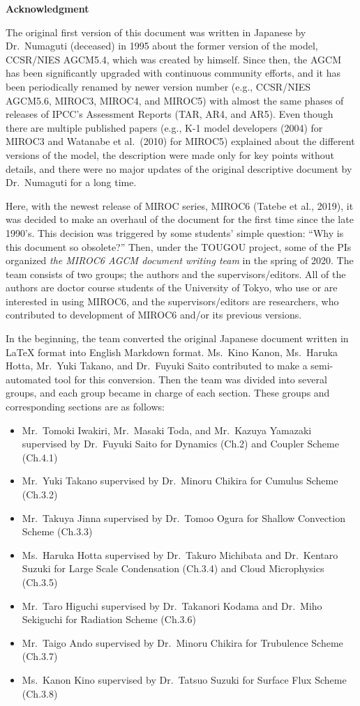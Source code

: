 \textbf{Acknowledgment}

The original first version of this document was written in Japanese by
Dr.~Numaguti (deceased) in 1995 about the former version of the model,
CCSR/NIES AGCM5.4, which was created by himself. Since then, the AGCM
has been significantly upgraded with continuous community efforts, and
it has been periodically renamed by newer version number (e.g.,
CCSR/NIES AGCM5.6, MIROC3, MIROC4, and MIROC5) with almost the same
phases of releases of IPCC's Assessment Reports (TAR, AR4, and AR5).
Even though there are multiple published papers (e.g., K-1 model
developers (2004) for MIROC3 and Watanabe et al.~(2010) for MIROC5)
explained about the different versions of the model, the description
were made only for key points without details, and there were no major
updates of the original descriptive document by Dr.~Numaguti for a long
time.

Here, with the newest release of MIROC series, MIROC6 (Tatebe et al.,
2019), it was decided to make an overhaul of the document for the first
time since the late 1990's. This decision was triggered by some
students' simple question: ``Why is this document so obsolete?'' Then,
under the TOUGOU project, some of the PIs organized \emph{the MIROC6
AGCM document writing team} in the spring of 2020. The team consists of
two groups; the authors and the supervisors/editors. All of the authors
are doctor course students of the University of Tokyo, who use or are
interested in using MIROC6, and the supervisors/editors are researchers,
who contributed to development of MIROC6 and/or its previous versions.

In the beginning, the team converted the original Japanese document
written in LaTeX format into English Markdown format. Ms.~Kino Kanon,
Ms.~Haruka Hotta, Mr.~Yuki Takano, and Dr.~Fuyuki Saito contributed to
make a semi-automated tool for this conversion. Then the team was
divided into several groups, and each group became in charge of each
section. These groups and corresponding sections are as follows:

\begin{itemize}
\item
  Mr.~Tomoki Iwakiri, Mr.~Masaki Toda, and Mr.~Kazuya Yamazaki
  supervised by Dr.~Fuyuki Saito for Dynamics (Ch.2) and Coupler Scheme
  (Ch.4.1)
\item
  Mr.~Yuki Takano supervised by Dr.~Minoru Chikira for Cumulus Scheme
  (Ch.3.2)
\item
  Mr.~Takuya Jinna supervised by Dr.~Tomoo Ogura for Shallow Convection
  Scheme (Ch.3.3)
\item
  Ms.~Haruka Hotta supervised by Dr.~Takuro Michibata and Dr.~Kentaro
  Suzuki for Large Scale Condensation (Ch.3.4) and Cloud Microphysics
  (Ch.3.5)
\item
  Mr.~Taro Higuchi supervised by Dr.~Takanori Kodama and Dr.~Miho
  Sekiguchi for Radiation Scheme (Ch.3.6)
\item
  Mr.~Taigo Ando supervised by Dr.~Minoru Chikira for Trubulence Scheme
  (Ch.3.7)
\item
  Ms.~Kanon Kino supervised by Dr.~Tatsuo Suzuki for Surface Flux Scheme
  (Ch.3.8)
\end{itemize}

